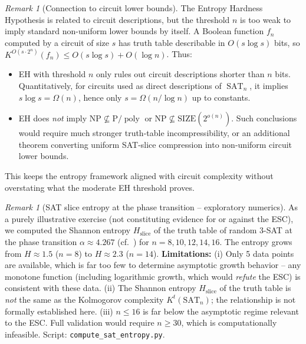 \documentclass[aps,prd,twocolumn,superscriptaddress,nofootinbib]{revtex4-2}
\theoremstyle{definition}
\theoremstyle{remark}
\newtheorem{remark}[theorem]{Remark}
\DeclareMathOperator{\poly}{poly}
\DeclareMathOperator{\SAT}{SAT}
\newcommand{\NP}{\mathrm{NP}}
\newcommand{\PP}{\mathrm{P}}
\begin{document}
\begin{remark}[Connection to circuit lower bounds]
\label{rem:circuit-connection}
The Entropy Hardness Hypothesis is related to circuit descriptions, but the threshold $n$ is too weak to imply standard non-uniform lower bounds by itself. A Boolean function $f_n$ computed by a circuit of size $s$ has truth table describable in $O(s \log s)$ bits, so $K^{O(s \cdot 2^n)}(f_n) \leq O(s \log s) + O(\log n)$. Thus:
\begin{itemize}
\item EH with threshold $n$ only rules out circuit descriptions shorter than $n$ bits. Quantitatively, for circuits used as direct descriptions of $\SAT_n$, it implies $s\log s=\Omega(n)$, hence only $s=\Omega(n/\log n)$ up to constants.
\item EH does \emph{not} imply $\NP \not\subseteq \PP/\poly$ or $\NP \not\subseteq \mathrm{SIZE}(2^{o(n)})$. Such conclusions would require much stronger truth-table incompressibility, or an additional theorem converting uniform SAT-slice compression into non-uniform circuit lower bounds.
\end{itemize}
This keeps the entropy framework aligned with circuit complexity without overstating what the moderate EH threshold proves.
\end{remark}

\begin{remark}[SAT slice entropy at the phase transition -- exploratory numerics]
\label{rem:sat-entropy}
As a purely illustrative exercise (not constituting evidence for or against the ESC), we computed the Shannon entropy $H_{\mathrm{slice}}$ of the truth table of random 3-SAT at the phase transition $\alpha \approx 4.267$ (cf.~\cite{Monasson1999,MezardZecchina2002,AchlioptasRicci2006}) for $n = 8, 10, 12, 14, 16$. The entropy grows from $H \approx 1.5$ ($n=8$) to $H \approx 2.3$ ($n=14$). \textbf{Limitations:} (i) Only 5 data points are available, which is far too few to determine asymptotic growth behavior -- any monotone function (including logarithmic growth, which would \emph{refute} the ESC) is consistent with these data. (ii) The Shannon entropy $H_{\mathrm{slice}}$ of the truth table is \emph{not} the same as the Kolmogorov complexity $K^t(\mathrm{SAT}_n)$; the relationship is not formally established here. (iii) $n \leq 16$ is far below the asymptotic regime relevant to the ESC. Full validation would require $n \geq 30$, which is computationally infeasible. Script: \texttt{compute\_sat\_entropy.py}.
\end{remark}
\end{document}
